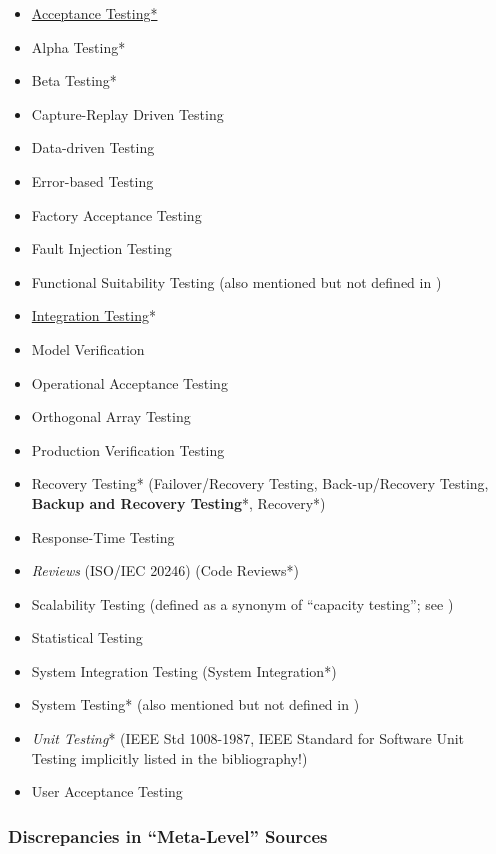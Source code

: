 \begin{itemize}
      \item \underline{Acceptance Testing*}
      \item Alpha Testing*
      \item Beta Testing*
      \item Capture-Replay Driven Testing
      \item Data-driven Testing
      \item Error-based Testing
      \item Factory Acceptance Testing
      \item Fault Injection Testing
      \item Functional Suitability Testing (also mentioned but not defined in
            \citep{IEEE2017})
      \item \underline{Integration Testing}*
      \item Model Verification
      \item Operational Acceptance Testing
      \item Orthogonal Array Testing
      \item Production Verification Testing
      \item Recovery Testing* (Failover/Recovery Testing, Back-up/Recovery
            Testing, \textbf{Backup and Recovery Testing}*, Recovery*)
      \item Response-Time Testing
      \item \emph{Reviews} (ISO/IEC 20246) (Code Reviews*)
      \item Scalability Testing (defined as a synonym of ``capacity testing'';
            see )
      \item Statistical Testing
      \item System Integration Testing (System Integration*)
      \item System Testing* (also mentioned but not defined in \citep{IEEE2013})
      \item \emph{Unit Testing}* (IEEE Std 1008-1987, IEEE Standard for
            Software Unit Testing implicitly listed in the bibliography!)
      \item User Acceptance Testing
\end{itemize}

\subsubsection{Discrepancies in ``Meta-Level'' Sources}

